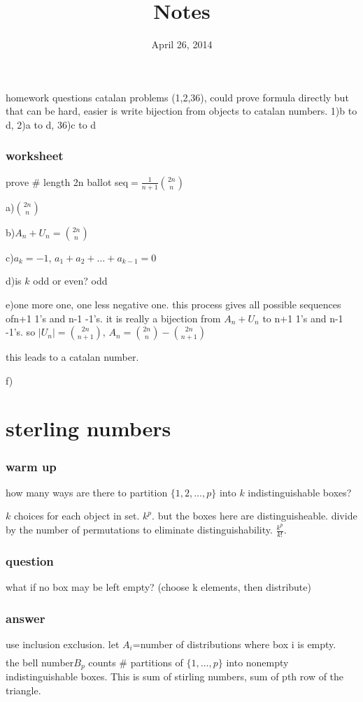 \documentclass{article}
\newcommand{\abs}[1]{\left\lvert #1 \right\rvert}
\begin{document}
\title{Notes}
\date{April 26, 2014}
\maketitle
homework questions
catalan problems (1,2,36), could prove formula directly but that can be hard, easier is write bijection from objects to catalan numbers.
1)b to d, 2)a to d, 36)c to d

\subsubsection*{worksheet}

prove \# length 2n ballot seq$=\frac{1}{n+1}\binom{2n}{n}$

a)$\binom{2n}{n}$

b)$A_n+U_n=\binom{2n}{n}$

c)$a_k=-1$, $a_1+a_2+\dots+a_{k-1}=0$

d)is $k$ odd or even? odd

e)one more one, one less negative one. this process gives all possible sequences ofn+1 1's and n-1 -1's. it is really a bijection from $A_n+U_n$ to n+1 1's and n-1 -1's. so $\abs{U_n}=\binom{2n}{n+1}$, $A_n=\binom{2n}{n}-\binom{2n}{n+1}$

this leads to a catalan number.


f)

\section*{sterling numbers}
\subsubsection*{warm up}
how many ways are there to partition $\{1,2,\dots,p\}$ into $k$ indistinguishable boxes?

$k$ choices for each object in set. $k^p$. but the boxes here are distinguisheable. divide by the number of permutations to eliminate distinguishability. $\frac{k^p}{k!}$.

\subsubsection*{question}
what if no box may be left empty? (choose k elements, then distribute)
\subsubsection*{answer}
use inclusion exclusion. let $A_i$=number of distributions where box i is empty.
\begin{align*}
  
\end{align*}
the bell number$B_p$ counts \# partitions of $\{1,\dots,p\}$ into nonempty indistinguishable boxes. This is sum of stirling numbers, sum of pth row of the triangle.
\end{document}
